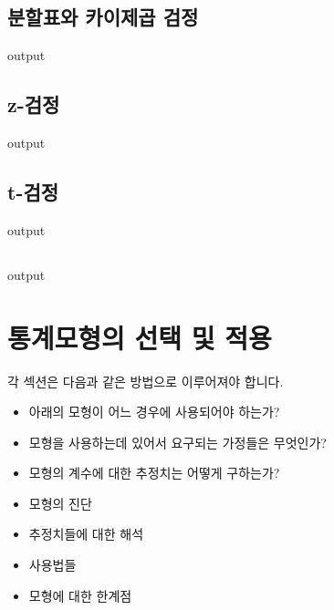 \section{분할표와 카이제곱 검정}
\begin{Schunk}
\begin{Soutput}
output
\end{Soutput}
\end{Schunk}

\section{z-검정}
\begin{Schunk}
\begin{Soutput}
output
\end{Soutput}
\end{Schunk}

\section{t-검정}
\begin{Schunk}
\begin{Soutput}
output
\end{Soutput}
\end{Schunk}

\section{}
\begin{Schunk}
\begin{Soutput}
output
\end{Soutput}
\end{Schunk}




\chapter{통계모형의 선택 및 적용}

각 섹션은 다음과 같은 방법으로 이루어져야 합니다. 
\begin{itemize}
\item 아래의 모형이 어느 경우에 사용되어야 하는가?
\item 모형을 사용하는데 있어서 요구되는 가정들은 무엇인가?
\item 모형의 계수에 대한 추정치는 어떻게 구하는가?
\item 모형의 진단
\item 추정치들에 대한 해석
\item 사용법들 
\item 모형에 대한 한계점
\end{itemize}

